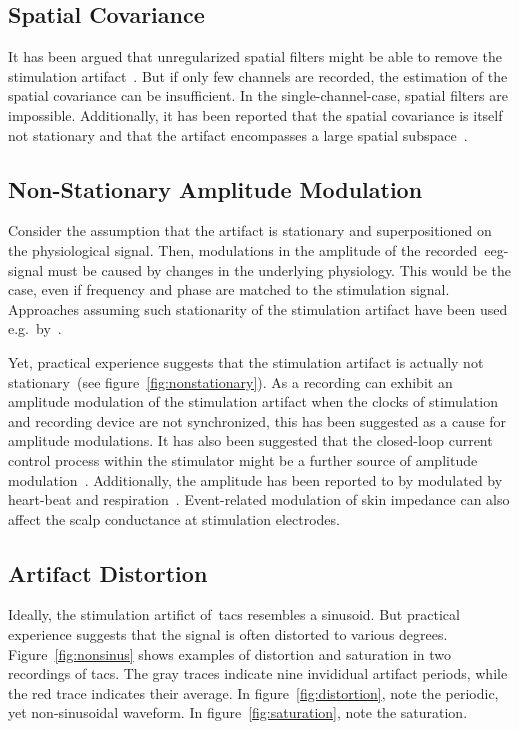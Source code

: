 \documentclass[a4paper]{article}
\newcommand{\figref}[1]{(see figure~\ref{#1})}
\begin{document}
\subsection{Spatial Covariance}

It has been argued that unregularized spatial filters might be able to remove the stimulation artifact~\citep{Neuling_2017}. But if only few channels are recorded, the estimation of the spatial covariance can be insufficient. In the single-channel-case, spatial filters are impossible.
Additionally, it has been reported that the spatial covariance is itself not stationary and that the artifact encompasses a large spatial subspace~\citep{Noury_2016}.

\subsection{Non-Stationary Amplitude Modulation}

Consider the assumption that the artifact is stationary and superpositioned on the physiological signal.
Then, modulations in the amplitude of the recorded~\gls{eeg}-signal must be caused by changes in the underlying physiology.
This would be the case, even if frequency and phase are matched to the stimulation signal. Approaches assuming such stationarity of the stimulation artifact have been used e.g.\ by~\cite{Pogosyan_2009}.

Yet, practical experience suggests that the stimulation artifact is actually not stationary~\figref{fig:nonstationary}.
As a recording can exhibit an amplitude modulation of the stimulation artifact when the clocks of stimulation and recording device are not synchronized, this has been suggested as a cause for amplitude modulations.
It has also been suggested that the closed-loop current control process within the stimulator might be a further source of amplitude modulation~\citep{Neuling_2017}.
Additionally, the amplitude has been reported to by modulated by heart-beat and respiration~\citep{Noury_2016}. Event-related modulation of skin impedance can also affect the scalp conductance at stimulation electrodes.

\subsection{Artifact Distortion}

Ideally, the stimulation artifict of~\gls{tacs} resembles a sinusoid. But practical experience suggests that the signal is often distorted to various degrees.
Figure~\ref{fig:nonsinus} shows examples of distortion and saturation in two recordings of \gls{tacs}. The gray traces indicate nine invididual artifact periods, while the red trace indicates their average. In figure~\ref{fig:distortion}, note the periodic, yet non-sinusoidal waveform. In figure~\ref{fig:saturation}, note the saturation.
\end{document}
